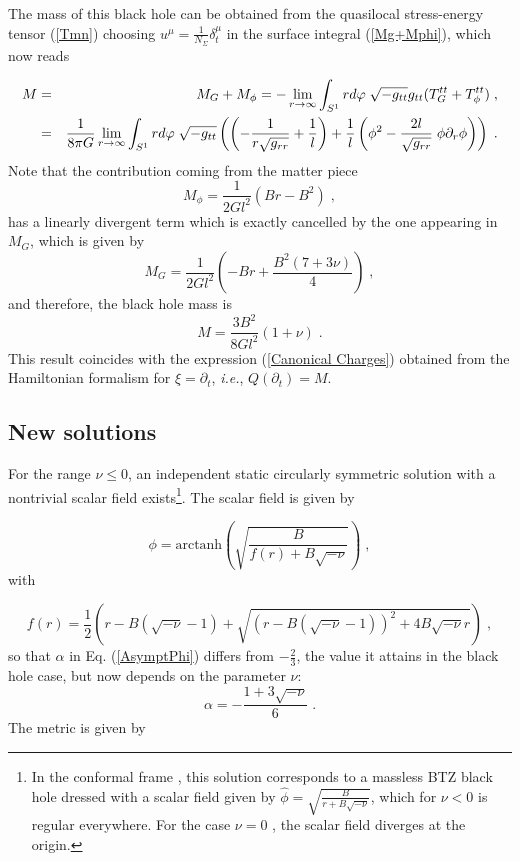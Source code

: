 \documentclass[a4paper,12pt]{article}
\begin{document}
The mass of this black hole can be obtained from the quasilocal
stress-energy tensor (\ref{Tmn}) choosing $u^{\mu }=\frac{1}{N_{\Sigma }}%
\delta _{t}^{\mu }$ in the surface integral (\ref{Mg+Mphi}), which now reads

\begin{eqnarray*}
M &=&M_{G}+M_{\phi }=-\lim_{r\rightarrow \infty }\int_{S^{1}}rd\varphi \;%
\sqrt{-g_{tt}}g_{tt}(T_{G}^{tt}+T_{\phi }^{tt})\;, \\
&=&\frac{1}{8\pi G}\lim_{r\rightarrow \infty }\int_{S^{1}}rd\varphi \;\sqrt{%
-g_{tt}}\left( \left( -\frac{1}{r\sqrt{g_{rr}}}+\frac{1}{l}\right) +\frac{1}{%
l}\left( \phi ^{2}-\frac{2l}{\sqrt{g_{rr}}}\;\phi \partial _{r}\phi \right)
\right) \;.
\end{eqnarray*}
Note that the contribution coming from the matter piece 
\[
M_{\phi }=\frac{1}{2Gl^{2}}\left( Br-B^{2}\right) \;, 
\]
has a linearly divergent term which is exactly cancelled by the one
appearing in $M_{G}$, which is given by 
\[
M_{G}=\frac{1}{2Gl^{2}}\left( -Br+\frac{B^{2}(7+3\nu )}{4}\right) \;, 
\]
and therefore, the black hole mass is 
\begin{equation}
M=\frac{3B^{2}}{8Gl^{2}}(1+\nu )\;.  \label{BH-Mass}
\end{equation}
This result coincides with the expression (\ref{Canonical Charges}) obtained
from the Hamiltonian formalism for $\xi =\partial _{t}$, \textit{i.e.}, $%
Q(\partial _{t})=M$.

\subsection{New solutions}

For the range $\nu \leq 0$, an independent static circularly symmetric
solution with a nontrivial scalar field exists\footnote{%
In the conformal frame \cite{HMTZ}, this solution corresponds to a massless
BTZ black hole dressed with a scalar field given by $\hat{\phi}=\sqrt{\frac{B%
}{r+B\sqrt{-\nu }}}$, which for $\nu <0$ is regular everywhere. For the case 
$\nu =0$ \cite{Natsuume:1999cd, Ayon-Beato:2001sb}, the scalar field
diverges at the origin.}. The scalar field is given by

\begin{equation}
\phi =\textrm{arctanh}\left( \sqrt{\frac{B}{f(r)+B\sqrt{-\nu }}}\right) \;,
\label{PhiNS}
\end{equation}
with

\begin{equation}
f(r)=\frac{1}{2}\left( r-B(\sqrt{-\nu }-1)+\sqrt{\left( r-B\left( \sqrt{-\nu 
}-1\right) \right) ^{2}+4B\sqrt{-\nu }r}\right) \;,  \label{f}
\end{equation}
so that $\alpha $ in Eq. (\ref{AsymptPhi}) differs from $-\frac{2}{3}$,  
the value it attains in the black hole case, but now depends on the parameter $\nu $:
\[
\alpha =-\frac{1+3\sqrt{-\nu }}{6}\;.
\]
The metric is given by
\end{document}
